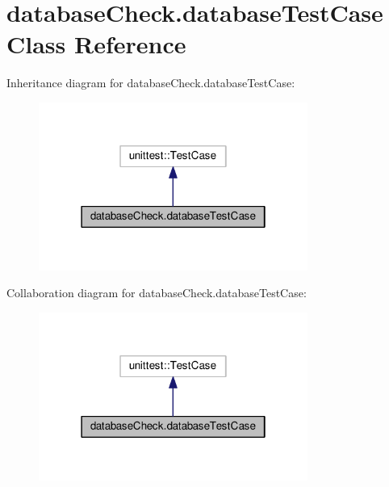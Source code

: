 \hypertarget{classdatabaseCheck_1_1databaseTestCase}{}\section{database\+Check.\+database\+Test\+Case Class Reference}
\label{classdatabaseCheck_1_1databaseTestCase}


Inheritance diagram for database\+Check.\+database\+Test\+Case\+:
\nopagebreak
\begin{figure}[H]
\begin{center}
\leavevmode
\includegraphics[width=250pt]{classdatabaseCheck_1_1databaseTestCase__inherit__graph}
\end{center}
\end{figure}


Collaboration diagram for database\+Check.\+database\+Test\+Case\+:
\nopagebreak
\begin{figure}[H]
\begin{center}
\leavevmode
\includegraphics[width=250pt]{classdatabaseCheck_1_1databaseTestCase__coll__graph}
\end{center}
\end{figure}
